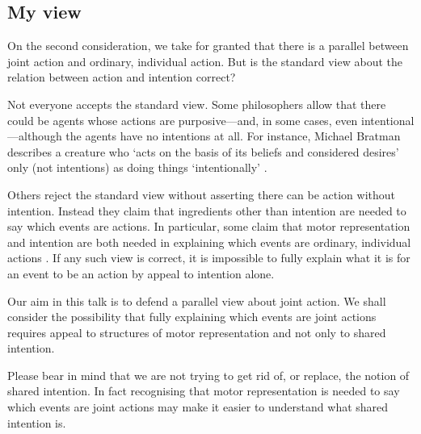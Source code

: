\documentclass[12pt,\papersize]{extarticle}
\begin{document}
\subsection{My view}
On the second consideration, 
we take for granted that there is a parallel between joint action and ordinary, individual action.
But is the standard view about the relation between action and intention correct? 

Not everyone accepts the standard view.
Some philosophers allow that there could be agents whose actions are purposive---and, in some cases, even intentional---although  the agents have no intentions at all.
For instance, Michael Bratman describes a creature who `acts on the basis of its beliefs and considered desires' only (not intentions) as doing things `intentionally' \citet[p.\ 251]{bratman:2000_valuing}.%

Others reject the standard view without asserting there can be action without intention.
Instead they claim that ingredients other than intention are needed to say which events are actions.
In particular, some claim that motor representation and intention are both needed in explaining which events are ordinary, individual actions \citep{pacherie:2000_content,butterfill:2012_intention}.
If any such view is correct, it is impossible to fully explain what it is for an event to be an action by appeal to intention alone.

Our aim in this talk is to defend a parallel view about joint action. 
We shall consider the possibility that fully explaining which events are joint actions requires appeal to structures of motor representation and not only to shared intention.

Please bear in mind that we are not trying to get rid of, or replace, the notion of shared intention.
In fact recognising that motor representation is needed to say which events are joint actions may make it easier to understand what shared intention is.
\end{document}
